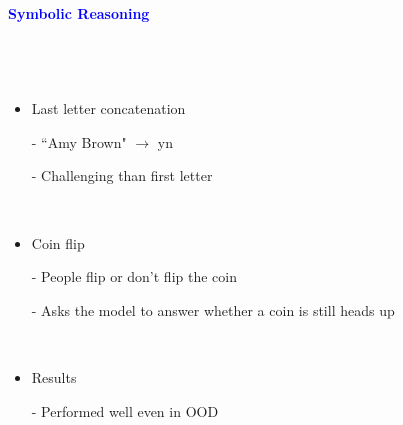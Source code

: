 \documentclass[professionalfont]{beamer}
\begin{document}
\begin{frame}
\begin{center}
    { \textbf{\textcolor{blue}{ {\fontsize{12}{14}\selectfont Symbolic Reasoning} }} }
\end{center}
\\[0.2cm]

\begin{columns}
    {\fontsize{10}{14}\selectfont 
    \begin{itemize}
        \item Last letter concatenation

        - ``Amy Brown" \( \rightarrow \) yn

        - Challenging than first letter

        \\[0.3cm]

        \item Coin flip

        - People flip or don’t flip the coin

        - Asks the model to answer whether a coin is still heads up

        \\[0.3cm]

        \item Results

        - Performed well even in OOD


\end{itemize}}
\end{columns}
\end{frame}
\end{document}
